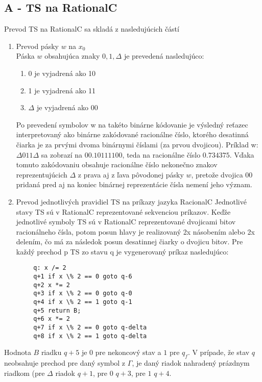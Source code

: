 \documentclass[10pt]{article}
\begin{document}
\subsection*{A - TS na RationalC}
Prevod TS na RationalC sa skladá z nasledujúcich částí
\begin{enumerate}
    \item Prevod pásky $w$ na $x_0$\\
        Páska $w$ obsahujúca znaky $0,1,\Delta$ je prevedená nasledujúco:
        \begin{enumerate}
            \item 0 je vyjadrená ako 10
            \item 1 je vyjadrená ako 11
            \item $\Delta$ je vyjadrená ako 00
        \end{enumerate}
        Po prevedení symbolov w na takéto binárne kódovanie je výsledný reťazec interpretovaný ako
        binárne zakódované racionálne číslo, ktorého desatinná čiarka je za prvými dvoma binárnymi
        číslami (za prvou dvojicou).
        Príklad w: $\Delta011\Delta$ sa zobrazí na $00. 10 11 11 00$, teda na racionálne číslo
        $0.734375$. Vďaka tomuto zakódovaniu obsahuje racionálne číslo nekonečno znakov
        reprezentujúcich $\Delta$ z prava aj z ľava pôvodonej pásky $w$, pretože dvojica 00 pridaná
        pred aj na koniec binárnej reprezentácie čísla nemení jeho význam.
    \item Prevod jednotlivých pravidiel TS na príkazy jazyka RacionalC
        Jednotlivé stavy TS sú v RationalC reprezentované sekvenciou príkazov. 
        Keďže jednotlivé symboly TS sú v RationalC reprezentované dvojicami bitov racionálneho čísla, potom posun hlavy je
        realizovaný 2x násobením alebo 2x delením, čo má za následok posun desatinnej čiarky o
        dvojicu bitov.
        Pre každý prechod p TS zo stavu q je vygenerovaný príkaz nasledujúco:
\end{enumerate}
        \begin{verbatim}
        q: x /= 2   
        q+1 if x \% 2 == 0 goto q-6 
        q+2 x *= 2
        q+3 if x \% 2 == 0 goto q-0 
        q+4 if x \% 2 == 1 goto q-1 
        q+5 return B;
        q+6 x *= 2
        q+7 if x \% 2 == 0 goto q-delta
        q+8 if x \% 2 == 1 goto q-delta
        \end{verbatim}
        Hodnota $B$ riadku $q+5$ je 0 pre nekoncový stav a $1$ pre $q_f$.
        V prípade, že stav $q$ neobsahuje prechod pre daný symbol z $\Gamma$, je daný riadok
        nahradený prázdnym riadkom (pre $\Delta$ riadok $q+1$, pre $0$ $q+3$, pre $1$ $q+4$.
\end{document}
